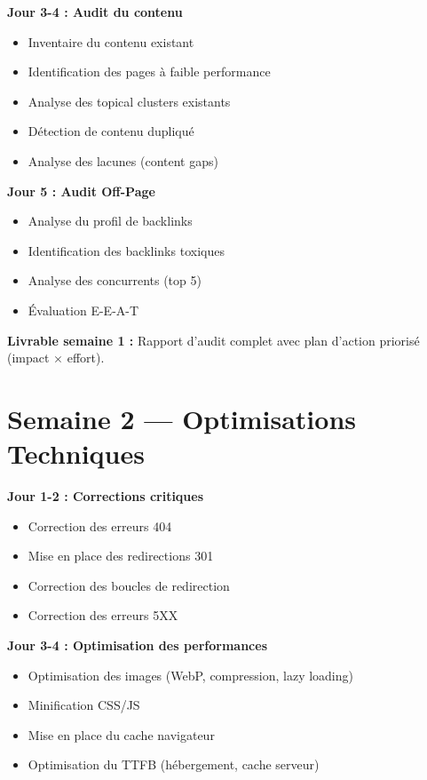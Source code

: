 \documentclass[12pt,a4paper]{report}
\begin{document}
\textbf{Jour 3-4 : Audit du contenu}
\begin{itemize}
\item[$\square$] Inventaire du contenu existant
\item[$\square$] Identification des pages à faible performance
\item[$\square$] Analyse des topical clusters existants
\item[$\square$] Détection de contenu dupliqué
\item[$\square$] Analyse des lacunes (content gaps)
\end{itemize}

\textbf{Jour 5 : Audit Off-Page}
\begin{itemize}
\item[$\square$] Analyse du profil de backlinks
\item[$\square$] Identification des backlinks toxiques
\item[$\square$] Analyse des concurrents (top 5)
\item[$\square$] Évaluation E-E-A-T
\end{itemize}

\textbf{Livrable semaine 1 :}
Rapport d'audit complet avec plan d'action priorisé (impact $\times$ effort).

\section{Semaine 2 --- Optimisations Techniques}

\textbf{Jour 1-2 : Corrections critiques}
\begin{itemize}
\item[$\square$] Correction des erreurs 404
\item[$\square$] Mise en place des redirections 301
\item[$\square$] Correction des boucles de redirection
\item[$\square$] Correction des erreurs 5XX
\end{itemize}

\textbf{Jour 3-4 : Optimisation des performances}
\begin{itemize}
\item[$\square$] Optimisation des images (WebP, compression, lazy loading)
\item[$\square$] Minification CSS/JS
\item[$\square$] Mise en place du cache navigateur
\item[$\square$] Optimisation du TTFB (hébergement, cache serveur)
\end{itemize}
\end{document}

